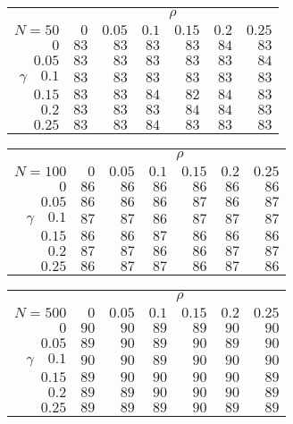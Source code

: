 \begin{tabular}{r|rrrrrr}
\hline\hline
 &\multicolumn{6}{c}{$\rho$} \\ 
 $N = 50$ & $0$ & $0.05$ & $0.1$ & $0.15$ & $0.2$ & $0.25$ \\ 
 \hline$0$ & $83$ & $83$ & $83$ & $83$ & $84$ & $83$\\ 
$0.05$ & $83$ & $83$ & $83$ & $83$ & $83$ & $84$\\ 
$\gamma\quad$$0.1$ & $83$ & $83$ & $83$ & $83$ & $83$ & $83$\\ 
$0.15$ & $83$ & $83$ & $84$ & $82$ & $84$ & $83$\\ 
$0.2$ & $83$ & $83$ & $83$ & $84$ & $84$ & $83$\\ 
$0.25$ & $83$ & $83$ & $84$ & $83$ & $83$ & $83$\\ 
 \hline 
 \end{tabular}
 
 \vspace{2em} 
 
\begin{tabular}{r|rrrrrr}
\hline\hline
 &\multicolumn{6}{c}{$\rho$} \\ 
 $N = 100$ & $0$ & $0.05$ & $0.1$ & $0.15$ & $0.2$ & $0.25$ \\ 
 \hline$0$ & $86$ & $86$ & $86$ & $86$ & $86$ & $86$\\ 
$0.05$ & $86$ & $86$ & $86$ & $87$ & $86$ & $87$\\ 
$\gamma\quad$$0.1$ & $87$ & $87$ & $86$ & $87$ & $87$ & $87$\\ 
$0.15$ & $86$ & $86$ & $87$ & $86$ & $86$ & $86$\\ 
$0.2$ & $87$ & $87$ & $86$ & $86$ & $87$ & $87$\\ 
$0.25$ & $86$ & $87$ & $87$ & $86$ & $87$ & $86$\\ 
 \hline 
 \end{tabular}
 
 \vspace{2em} 
 
\begin{tabular}{r|rrrrrr}
\hline\hline
 &\multicolumn{6}{c}{$\rho$} \\ 
 $N = 500$ & $0$ & $0.05$ & $0.1$ & $0.15$ & $0.2$ & $0.25$ \\ 
 \hline$0$ & $90$ & $90$ & $89$ & $89$ & $90$ & $90$\\ 
$0.05$ & $89$ & $90$ & $89$ & $90$ & $89$ & $90$\\ 
$\gamma\quad$$0.1$ & $90$ & $90$ & $89$ & $90$ & $90$ & $90$\\ 
$0.15$ & $89$ & $90$ & $90$ & $90$ & $90$ & $89$\\ 
$0.2$ & $89$ & $89$ & $90$ & $90$ & $90$ & $89$\\ 
$0.25$ & $89$ & $89$ & $89$ & $90$ & $89$ & $89$\\ 
 \hline 
 \end{tabular}